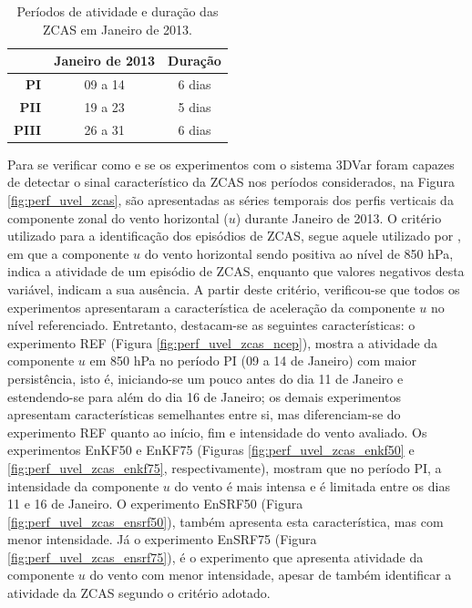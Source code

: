 \begin{table}[H]
\caption{Períodos de atividade e duração das ZCAS em Janeiro de 2013.}
\begin{center}
\begin{adjustbox}{max width=\textwidth}
\begin{tabular}{rcc}
\toprule
\toprule
 & Janeiro de 2013 & Duração \\
\midrule
\textbf{PI}   & 09 a 14 & 6 dias \\
\textbf{PII}  & 19 a 23 & 5 dias \\
\textbf{PIII} & 26 a 31 & 6 dias \\
\bottomrule                                         
\end{tabular}
\end{adjustbox}
\end{center}
\label{tab:periodos_zcas}
\end{table}

Para se verificar como e se os experimentos com o sistema 3DVar foram capazes de detectar o sinal característico da ZCAS nos períodos considerados, na Figura \ref{fig:perf_uvel_zcas}, são apresentadas as séries temporais dos perfis verticais da componente zonal do vento horizontal ($u$) durante Janeiro de 2013. O critério utilizado para a identificação dos episódios de ZCAS, segue aquele utilizado por , em que a componente $u$ do vento horizontal sendo positiva ao nível de 850 hPa, indica a atividade de um episódio de ZCAS, enquanto que valores negativos desta variável, indicam a sua ausência. A partir deste critério, verificou-se que todos os experimentos apresentaram a característica de aceleração da componente $u$ no nível referenciado. Entretanto, destacam-se as seguintes características: o experimento REF (Figura \ref{fig:perf_uvel_zcas_ncep}), mostra a atividade da componente $u$ em 850 hPa no período PI (09 a 14 de Janeiro) com maior persistência, isto é, iniciando-se um pouco antes do dia 11 de Janeiro e estendendo-se para além do dia 16 de Janeiro; os demais experimentos apresentam características semelhantes entre si, mas diferenciam-se do experimento REF quanto ao início, fim e intensidade do vento avaliado. Os experimentos EnKF50 e EnKF75 (Figuras \ref{fig:perf_uvel_zcas_enkf50} e \ref{fig:perf_uvel_zcas_enkf75}, respectivamente), mostram que no período PI, a intensidade da componente $u$ do vento é mais intensa e é limitada entre os dias 11 e 16 de Janeiro. O experimento EnSRF50 (Figura \ref{fig:perf_uvel_zcas_ensrf50}), também apresenta esta característica, mas com menor intensidade. Já o experimento EnSRF75 (Figura \ref{fig:perf_uvel_zcas_ensrf75}), é o experimento que apresenta atividade da componente $u$ do vento com menor intensidade, apesar de também identificar a atividade da ZCAS segundo o critério adotado.


